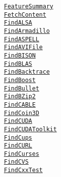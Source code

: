 \documentclass{article}
\newcommand{\cmakemodule}[1]{{\href{https://cmake.org/cmake/help/v3.20/module/#1.html}{{\lstinline{#1}}}}}
\begin{document}
\begin{minipage}[t]{0.18\linewidth}
\cmakemodule{FeatureSummary}\\
\cmakemodule{FetchContent}\\
\cmakemodule{FindALSA}\\
\cmakemodule{FindArmadillo}\\
\cmakemodule{FindASPELL}\\
\cmakemodule{FindAVIFile}\\
\cmakemodule{FindBISON}\\
\cmakemodule{FindBLAS}\\
\cmakemodule{FindBacktrace}\\
\cmakemodule{FindBoost}\\
\cmakemodule{FindBullet}\\
\cmakemodule{FindBZip2}\\
\cmakemodule{FindCABLE}\\
\cmakemodule{FindCoin3D}\\
\cmakemodule{FindCUDA}\\
\cmakemodule{FindCUDAToolkit}\\
\cmakemodule{FindCups}\\
\cmakemodule{FindCURL}\\
\cmakemodule{FindCurses}\\
\cmakemodule{FindCVS}\\
\cmakemodule{FindCxxTest}\\
\end{minipage}
\hfill\vline\hfill
\end{document}
